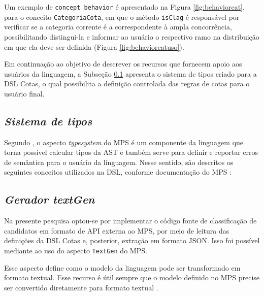 Um exemplo de \texttt{concept behavior} é apresentado na Figura \ref{fig:behaviorcat}, para o conceito \texttt{CategoriaCota}, em que o método \texttt{isClag} é responsável por verificar se a categoria corrente é a correspondente à ampla concorrência, possibilitando distingui-la e informar ao usuário o respectivo ramo na distribuição em que ela deve ser definida (Figura \ref{fig:behaviorcatuso}).





\newpage
Em continuação ao objetivo de descrever os recursos que fornecem apoio aos usuários da linguagem, a Subseção \ref{sub:sec:typesystem} apresenta o sistema de tipos criado para a DSL Cotas, o qual possibilita a definição controlada das regras de cotas para o usuário final.


\subsection{\textit{Sistema de tipos}}
\label{sub:sec:typesystem}

Segundo , o aspecto \textit{typesystem} do \gls{MPS} é um componente da linguagem que torna possível calcular tipos da \gls{AST} e também serve para definir e reportar erros de semântica para o usuário da linguagem. Nesse sentido, são descritos os seguintes conceitos utilizados na DSL, conforme documentação do \gls{MPS} :





\newpage
\subsection{\textit{Gerador textGen}}
\label{sub:sec:texgen}

Na presente pesquisa optou-se por implementar o código fonte de classificação de candidatos em formato de \gls{API} externa ao \gls{MPS}, por meio de leitura das definições da DSL Cotas e, posterior, extração em formato JSON. Isso foi possível mediante ao uso do aspecto \texttt{TextGen} do MPS.

Esse aspecto define como o modelo da linguagem pode ser transformado em formato textual. Esse recurso é útil sempre que o modelo definido no MPS precise ser convertido diretamente para formato textual \cite{jetbrains}. 

